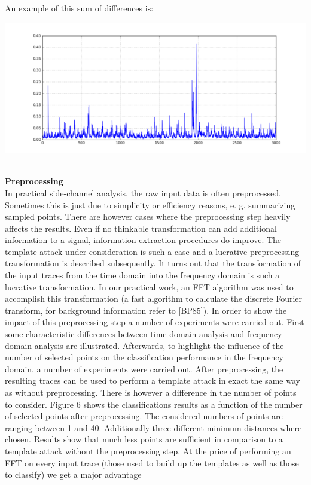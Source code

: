         An example of this sum of differences is:\\
              \begin{minipage}{\linewidth}
              \centering
              \includegraphics{images/Lecture_5/pic11.png}
              \end{minipage}
        \\

\textbf{Preprocessing}\\
    In practical side-channel analysis, the raw input data is often preprocessed.
    Sometimes this is just due to simplicity or efficiency reasons, e. g. summarizing sampled points. There are however cases where the preprocessing step heavily affects the results. Even if no thinkable transformation can add additional information to a signal, information extraction procedures do improve. The template attack under consideration is such a case and a lucrative preprocessing transformation is described subsequently.
    It turns out that the transformation of the input traces from the time domain
    into the frequency domain is such a lucrative transformation. In our practical work, an FFT algorithm was used to accomplish this transformation (a fast algorithm to calculate the discrete Fourier transform, for background information refer to [BP85]). In order to show the impact of this preprocessing step a number of experiments were carried out. First some characteristic differences between time domain analysis and frequency domain analysis are illustrated. Afterwards, to highlight the influence of the number of selected points on the classification performance in the frequency domain, a number of experiments were carried out. After preprocessing, the resulting traces can be used to perform a template attack in exact the same way as without preprocessing. There is however a difference in the number of points to consider. Figure 6 shows the classifications results as a function of the number of selected points after preprocessing. The considered numbers of points are ranging between 1 and 40. Additionally three different minimum distances where chosen. Results show that much less points are sufficient in comparison to a template attack without the preprocessing step.
    At the price of performing an FFT on every input trace (those used to build
    up the templates as well as those to classify) we get a major advantage\\


